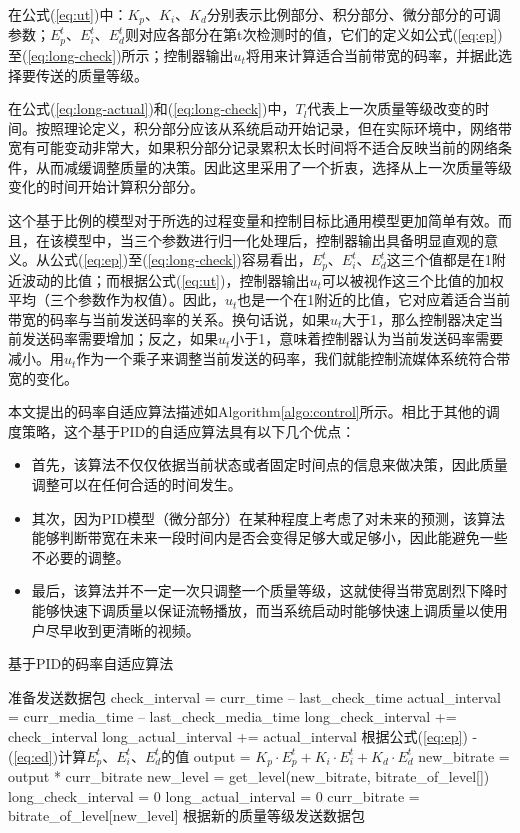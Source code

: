 在公式(\ref{eq:ut})中：$K_p$、$K_i$、$K_d$分别表示比例部分、积分部分、微分部分的可调参数；$E_p^t$、$E_i^t$、$E_d^t$则对应各部分在第t次检测时的值，它们的定义如公式(\ref{eq:ep})至(\ref{eq:long-check})所示；控制器输出$u_t$将用来计算适合当前带宽的码率，并据此选择要传送的质量等级。

在公式(\ref{eq:long-actual})和(\ref{eq:long-check})中，$T_l$代表上一次质量等级改变的时间。按照理论定义，积分部分应该从系统启动开始记录，但在实际环境中，网络带宽有可能变动非常大，如果积分部分记录累积太长时间将不适合反映当前的网络条件，从而减缓调整质量的决策。因此这里采用了一个折衷，选择从上一次质量等级变化的时间开始计算积分部分。

这个基于比例的模型对于所选的过程变量和控制目标比通用模型更加简单有效。而且，在该模型中，当三个参数进行归一化处理后，控制器输出具备明显直观的意义。从公式(\ref{eq:ep})至(\ref{eq:long-check})容易看出，$E_p^t$、$E_i^t$、$E_d^t$这三个值都是在1附近波动的比值；而根据公式(\ref{eq:ut})，控制器输出$u_t$可以被视作这三个比值的加权平均（三个参数作为权值）。因此，$u_t$也是一个在1附近的比值，它对应着适合当前带宽的码率与当前发送码率的关系。换句话说，如果$u_t$大于1，那么控制器决定当前发送码率需要增加；反之，如果$u_t$小于1，意味着控制器认为当前发送码率需要减小。用$u_t$作为一个乘子来调整当前发送的码率，我们就能控制流媒体系统符合带宽的变化。

本文提出的码率自适应算法描述如Algorithm\ref{algo:control}所示。相比于其他的调度策略，这个基于PID的自适应算法具有以下几个优点：
\begin{itemize}
	\item 首先，该算法不仅仅依据当前状态或者固定时间点的信息来做决策，因此质量调整可以在任何合适的时间发生。
	\item 其次，因为PID模型（微分部分）在某种程度上考虑了对未来的预测，该算法能够判断带宽在未来一段时间内是否会变得足够大或足够小，因此能避免一些不必要的调整。
	\item 最后，该算法并不一定一次只调整一个质量等级，这就使得当带宽剧烈下降时能够快速下调质量以保证流畅播放，而当系统启动时能够快速上调质量以使用户尽早收到更清晰的视频。
\end{itemize}

\begin{algorithm}
	\caption{基于PID的码率自适应算法}
	\label{algo:control}
	\begin{algorithmic}
		\STATE 准备发送数据包
		\STATE check\_interval = curr\_time -- last\_check\_time
		\STATE actual\_interval = curr\_media\_time -- last\_check\_media\_time
		\STATE long\_check\_interval += check\_interval
		\STATE long\_actual\_interval += actual\_interval
		\STATE 根据公式(\ref{eq:ep}) - (\ref{eq:ed})计算$E_p^t$、$E_i^t$、$E_d^t$的值
		\STATE output = ${K_p} \cdot E_p^t + {K_i} \cdot E_i^t + {K_d} \cdot E_d^t$
		\STATE new\_bitrate = output * curr\_bitrate
		\STATE new\_level = get\_level(new\_bitrate, bitrate\_of\_level[])
		\STATE long\_check\_interval = 0
		\STATE long\_actual\_interval = 0
		\STATE curr\_bitrate = bitrate\_of\_level[new\_level]
		\ENDIF
		\STATE 根据新的质量等级发送数据包
	\end{algorithmic}
\end{algorithm}

